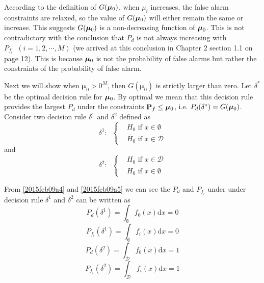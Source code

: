 According to the definition of $G(\boldsymbol{\mu}_0)$, when $\mu_i$ increases, the false alarm constraints are relaxed, 
so the value of $G(\boldsymbol{\mu}_0)$ will either remain the same or increase. 
This suggests $G(\boldsymbol{\mu}_0)$ is a non-decreasing function of $\boldsymbol{\mu}_0$. 
This is not contradictory with the conclusion that 
$P_d$ is not always increasing with $P_{f_i}\;\;(i=1, 2, \cdots, M)$  (we arrived at this conclusion in Chapter 2 section 1.1 on page 12).  This is because $\boldsymbol{\mu}_0$ is not the probability of false alarms but rather the constraints of the probability of false alarm. 

Next we will show when $\boldsymbol{\mu}_0 > 0^M$, then $G(\boldsymbol{\mu}_0)$ is strictly larger than zero.
Let $\delta^\ast$ be the optimal decision rule for $\boldsymbol{\mu}_0$. By optimal  we mean that this decision rule provides the largest $P_d$ under the constraints $\mathbf{P}_f \leq \boldsymbol{\mu}_0$, i.e. $P_d(\delta^\ast) = G(\boldsymbol{\mu}_0)$. Consider two decision rule $\delta^1$ and $\delta^2$ defined as 
\begin{equation}
  \label{2015feb09a4}
  \delta^1:\;\; \begin{cases}
    &\text{$H_0$ if } x \in \emptyset \\
    &\text{$\bar{H}_0$ if } x \in \mathcal{D}
  \end{cases}
\end{equation}
and
\begin{equation}
  \label{2015feb09a5}
  \delta^2:\;\; \begin{cases}
    &\text{$H_0$ if } x \in \mathcal{D} \\
    &\text{$\bar{H}_0$ if } x \in \emptyset
  \end{cases}
\end{equation}

From \eqref{2015feb09a4} and \eqref{2015feb09a5} we can see the $P_d$ and $P_{f_i}$ under under decision rule $\delta^1$ and $\delta^2$ can be written as
\begin{equation}
  P_d(\delta^1) = \int_{\emptyset}f_0(x)\mathrm{d}x = 0
\end{equation}
\begin{equation}
    P_{f_i}(\delta^1) = \int_{\emptyset}f_i(x)\mathrm{d}x = 0
\end{equation}
\begin{equation}
    P_d(\delta^2) = \int_{\mathcal{D}}f_0(x)\mathrm{d}x = 1
\end{equation}
\begin{equation}
    P_{f_i}(\delta^2) = \int_{\mathcal{D}}f_i(x)\mathrm{d}x = 1
\end{equation}

